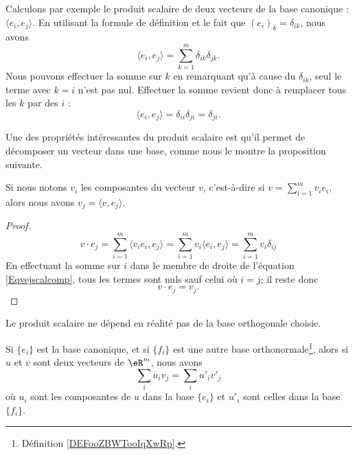 Calculons par exemple le produit scalaire de deux vecteurs de la base canonique : \( \langle e_i, e_j\rangle\). En utilisant la formule de définition et le fait que \( (e_i)_k=\delta_{ik}\), nous avons
\begin{equation}
	\langle e_i, e_j\rangle =\sum_{k=1}^m\delta_{ik}\delta_{jk}.
\end{equation}
Nous pouvons effectuer la somme sur \( k\) en remarquant qu'à cause du \( \delta_{ik}\), seul le terme avec \( k=i\) n'est pas nul. Effectuer la somme revient donc à remplacer tous les \( k\) par des \( i\) :
\begin{equation}
	\langle e_i, e_j\rangle =\delta_{ii}\delta_{ji}=\delta_{ji}.
\end{equation}

Une des propriétés intéressantes du produit scalaire est qu'il permet de décomposer un vecteur dans une base, comme nous le montre la proposition suivante.

\begin{proposition}     \label{PropScalCompDec}
	Si nous notons \( v_i\) les composantes du vecteur \( v\), c'est-à-dire si \( v=\sum_{i=1}^m v_ie_i\), alors nous avons \( v_j=\langle v, e_j\rangle\).
\end{proposition}

\begin{proof}
	\begin{equation}    \label{Eqvejscalcomp}
		v\cdot e_j=\sum_{i=1}^m\langle v_ie_i, e_j\rangle =\sum_{i=1}^mv_i\langle e_i, e_j\rangle =\sum_{i=1}^mv_i\delta_{ij}
	\end{equation}
	En effectuant la somme sur \( i\) dans le membre de droite de l'équation \eqref{Eqvejscalcomp}, tous les termes sont nuls sauf celui où \( i=j\); il reste donc
	\begin{equation}
		v\cdot e_j=v_j.
	\end{equation}
\end{proof}

Le produit scalaire ne dépend en réalité pas de la base orthogonale choisie.

\begin{lemma}       \label{LEMooZMCWooDfbrIq}
	Si \( \{ e_i \}\) est la base canonique, et si \( \{ f_i \}\) est une autre base orthonormale\footnote{Définition \ref{DEFooZBWTooIqXwRp}.}, alors si \( u\) et \( v\) sont deux vecteurs de \( \eR^m\), nous avons
	\begin{equation}
		\sum_i u_iv_j=\sum_iu'_iv'_j
	\end{equation}
	où \( u_i\) sont les composantes de \( u\) dans la base \( \{ e_i \}\) et \( u'_i\) sont celles dans la base \( \{ f_i \}\).
\end{lemma}

